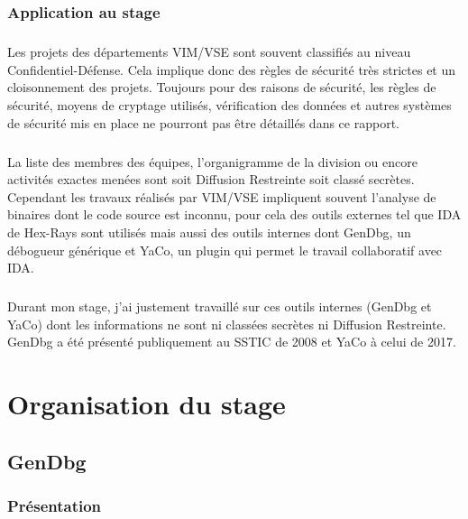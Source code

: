 \documentclass[11pt, book, english, french, standardlists]{upmethodology-document}
\begin{document}
			\subsection{Application au stage}
				\paragraph*{}
					Les projets des départements \gls{VIM/VSE} sont souvent classifiés au niveau Confidentiel-Défense. Cela implique donc des règles de sécurité très strictes et un cloisonnement des projets. Toujours pour des raisons de sécurité, les règles de sécurité, moyens de cryptage utilisés, vérification des données et autres systèmes de sécurité mis en place ne pourront pas être détaillés dans ce rapport.
				\paragraph*{}
					La liste des membres des équipes, l'organigramme de la division ou encore activités exactes menées sont soit Diffusion Restreinte soit classé secrètes. Cependant les travaux réalisés par \gls{VIM/VSE} impliquent souvent l'analyse de binaires dont le code source est inconnu, pour cela des outils externes tel que IDA de Hex-Rays sont utilisés mais aussi des outils internes dont GenDbg, un débogueur générique et YaCo, un plugin qui permet le travail collaboratif avec IDA.
				\paragraph*{}
					Durant mon stage, j'ai justement travaillé sur ces outils internes (GenDbg et YaCo) dont les informations ne sont ni classées secrètes ni Diffusion Restreinte. GenDbg a été présenté publiquement au \gls{SSTIC} de 2008\cite{SSTICGenDbg} et YaCo à celui de 2017\cite{SSTICYaCo}. %
	\chapter{Organisation du stage}
		\section{GenDbg}
			\subsection{Présentation}
\end{document}

